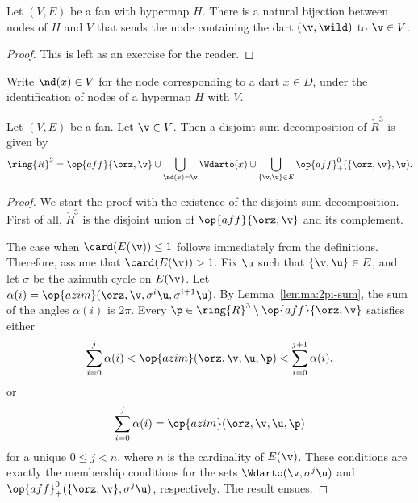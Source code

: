 
\begin{lemma}[]\label{lemma:node-vertex}
Let $(V,E)$ be a fan with hypermap $H$.  There is a natural bijection between
nodes of $H$ and $V$ that sends the node containing the dart $(\v,\wild)$
to $\v\in V$.
\end{lemma}

\begin{proof}  This is left as an exercise for the reader.
\end{proof}

\begin{definition}[$\nd$]
Write $\nd(x)\in V$ for the node corresponding to a dart $x\in D$,
under the identification of nodes of a hypermap $H$ with $V$.
\end{definition}
%

\begin{lemma}\label{lemma:disjoint}
  Let $(V,E)$ be a fan.  Let $\v\in V$.  Then  a disjoint sum
  decomposition of $\ring{R}^3$ is given by
\[ 
\ring{R}^3 = 
\op{aff}\{\orz,\v\} \cup
\bigcup_{\nd(x)=\v} \Wdarto(x)  \cup 
\bigcup_{\{\v,\w\}\in E} \op{aff}_+^0(\{\orz,\v\},\w).
\] 
\end{lemma}
%
%
%





\begin{proof}
We start the proof with the existence of the disjoint sum decomposition.
First of all, $\ring{R}^3$ is the disjoint union of $\op{aff}\{\orz,\v\}$
and its complement.

The case when $\card(E(\v))\le 1$ follows immediately from the
definitions.  Therefore, assume that $\card(E(\v)) >1$.  Fix $\u$ such
that $\{\v,\u\}\in E$, and let $\sigma$ be the azimuth cycle on
$E(\v)$.  Let $\alpha(i)=\op{azim}(\orz,\v,\sigma^i
\u,\sigma^{i+1}\u)$.  By Lemma~\ref{lemma:2pi-sum}, the sum of the
angles $\alpha(i)$ is $2\pi$.  Every
$\p\in\ring{R}^3\setminus\op{aff}\{\orz,\v\}$ satisfies either
\[ 
\sum_{i=0}^j \alpha(i) <
\op{azim}(\orz,\v,\u,\p) < \sum_{i=0}^{j+1} \alpha(i).
\] 
or 
\[ 
\sum_{i=0}^j \alpha(i) = \op{azim}(\orz,\v,\u,\p)
\] 
for a unique $0 \le j < n$, where $n$ is the cardinality of $E(\v)$. 
These conditions are exactly the membership conditions for the sets
$
\Wdarto(\v,\sigma^j \u)
$
and $\op{aff}_+^0(\{\orz,\v\},\sigma^j \u)$, respectively.
The result ensues.
\end{proof}

